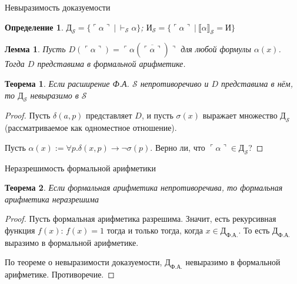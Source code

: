 \documentclass[aspectratio=169]{beamer}
\newtheorem{thm}{Теорема}[section]
\newtheorem{dfn}{Определение}[section]
\newtheorem{lmm}{Лемма}[section]
\begin{document}
\newcommand\doubleplus{+\kern-1.3ex+\kern0.8ex}
\newcommand\mdoubleplus{\ensuremath{\mathbin{+\mkern-10mu+}}}

\begin{frame}{Невыразимость доказуемости}
\begin{dfn}
$\text{Д}_\mathcal{S} = \{ \ulcorner\alpha\urcorner\ |\ \vdash_\mathcal{S}\alpha \}$; 
$\text{И}_\mathcal{S} = \{ \ulcorner\alpha\urcorner\ |\ \llbracket\alpha\rrbracket_\mathcal{S} = \text{И} \}$
\end{dfn}

\begin{lmm}Пусть $D(\ulcorner\alpha\urcorner) = \ulcorner\alpha(\overline{\ulcorner\alpha\urcorner})\urcorner$ для
любой формулы $\alpha(x)$. Тогда $D$ представима в формальной арифметике.
\end{lmm}


\begin{thm}Если расширение Ф.А. $\mathcal{S}$ непротиворечиво и $D$ представима в нём, то $\text{Д}_\mathcal{S}$ невыразимо в $\mathcal{S}$\end{thm}

\begin{proof}Пусть $\delta(a,p)$ представляет $D$, и пусть $\sigma(x)$ выражает множество $\text{Д}_\mathcal{S}$ (рассматриваемое как
одноместное отношение).

Пусть $\alpha(x) := \forall p.\delta(x,p)\rightarrow\neg\sigma(p)$. Верно ли, что $\ulcorner\alpha\urcorner\in\text{Д}_\mathcal{S}$?
\end{proof}
\end{frame}

\begin{frame}{Неразрешимость формальной арифметики}
\begin{thm}Если формальная арифметика непротиворечива, то формальная арифметика неразрешима\end{thm}
\begin{proof}
Пусть формальная арифметика разрешима. 
Значит, есть рекурсивная функция $f(x)$: $f(x)=1$ тогда и только тогда, 
когда $x \in \text{Д}_\text{Ф.А.}$. То есть $\text{Д}_\text{Ф.А.}$ выразимо в формальной арифметике.

По теореме о невыразимости доказуемости, 
$\text{Д}_\text{Ф.А.}$ невыразимо в формальной арифметике. Противоречие.
\end{proof}
\end{frame}
\end{document}
